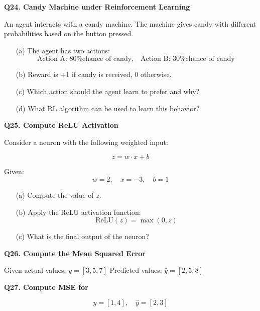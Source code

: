 \documentclass{article}
\begin{document}
\vspace{1\baselineskip}

\textbf{Q24. Candy Machine under Reinforcement Learning}

An agent interacts with a candy machine. The machine gives candy with different probabilities based on the button pressed.

\begin{itemize}
    \item[(a)] The agent has two actions:
    \[
    \text{Action A: 80\% chance of candy}, \quad \text{Action B: 30\% chance of candy}
    \]
    
    \item[(b)] Reward is +1 if candy is received, 0 otherwise.
    
    \item[(c)] Which action should the agent learn to prefer and why?

    \item[(d)] What RL algorithm can be used to learn this behavior?
\end{itemize}


\vspace{1\baselineskip}
\textbf{Q25. Compute ReLU Activation }

Consider a neuron with the following weighted input:

\[
z = w \cdot x + b
\]

Given:
\[
w = 2, \quad x = -3, \quad b = 1
\]

\begin{itemize}
    \item[(a)] Compute the value of \( z \).
    \item[(b)] Apply the ReLU activation function:
    \[
    \text{ReLU}(z) = \max(0, z)
    \]
    \item[(c)] What is the final output of the neuron?
\end{itemize}



\vspace{1\baselineskip}

\textbf{Q26. Compute the Mean Squared Error }

Given actual values: \( y = [3, 5, 7] \)  
Predicted values: \( \hat{y} = [2, 5, 8] \)

\vspace{0.5cm}

\textbf{Q27. Compute MSE for}

\[
y = [1, 4], \quad \hat{y} = [2, 3]
\]
\end{document}

